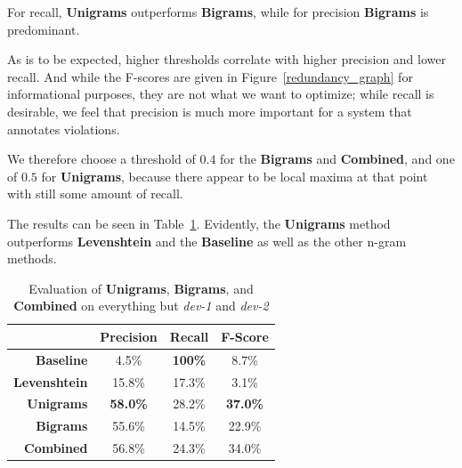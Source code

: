 \documentclass[a4paper,10pt]{scrartcl}
\theoremstyle{style}
\begin{document}
For recall, \textbf{Unigrams} outperforms \textbf{Bigrams}, while for precision \textbf{Bigrams} is predominant.

As is to be expected, higher thresholds correlate with higher precision and lower recall. And while the F-scores are given in Figure~\ref{redundancy_graph} for informational purposes, they are not what we want to optimize; while recall is desirable, we feel that precision is much more important for a system that annotates violations.

We therefore choose a threshold of $0.4$ for the \textbf{Bigrams} and \textbf{Combined}, and one of $0.5$ for \textbf{Unigrams}, because there appear to be local maxima at that point with still some amount of recall.

The results can be seen in Table~\ref{eval_redundancy}. Evidently, the \textbf{Unigrams} method outperforms \textbf{Levenshtein} and the \textbf{Baseline} as well as the other n-gram methods.

\begin{table}
\begin{center}
\begin{tabular}{r|c|c|c|}
& Precision & Recall & F-Score \\
\hline
\textbf{Baseline} & 4.5\% & \textbf{100\%} & 8.7\% \\
\hline
\textbf{Levenshtein} & 15.8\% & 17.3\% & 3.1\% \\
\hline
\textbf{Unigrams} & \textbf{58.0\%} & 28.2\% & \textbf{37.0\%} \\
\hline
\textbf{Bigrams} & 55.6\% & 14.5\% & 22.9\% \\
\hline
\textbf{Combined} & 56.8\% & 24.3\% & 34.0\% \\
\hline
\end{tabular}
\end{center}
\caption{Evaluation of \textbf{Unigrams}, \textbf{Bigrams}, and \textbf{Combined} on everything but \textit{dev-1} and \textit{dev-2}}
\label{eval_redundancy}
\end{table}




\end{document}
